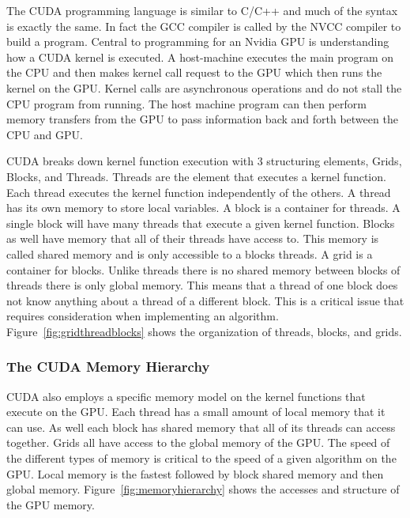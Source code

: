 \documentclass[conference]{IEEEtran}
\begin{document}
The CUDA programming language is similar to C/C++ and much of the syntax is exactly the same. In fact the GCC compiler is called by the NVCC compiler to build a program. Central to programming for an Nvidia GPU is understanding how a CUDA kernel is executed. A host-machine executes the main program on the CPU and then makes kernel call request to the GPU which then runs the kernel on the GPU. Kernel calls are asynchronous operations and do not stall the CPU program from running. The host machine program can then perform memory transfers from the GPU to pass information back and forth between the CPU and GPU.

CUDA breaks down kernel function execution with 3 structuring elements, Grids, Blocks, and Threads. Threads are the element that executes a kernel function. Each thread executes the kernel function independently of the others. A thread has its own memory to store local variables. A block is a container for threads. A single block will have many threads that execute a given kernel function. Blocks as well have memory that all of their threads have access to. This memory is called shared memory and is only accessible to a blocks threads. A grid is a container for blocks. Unlike threads there is no shared memory between blocks of threads there is only global memory. This means that a thread of one block does not know anything about a thread of a different block. This is a critical issue that requires consideration when implementing an algorithm. Figure~\ref{fig:gridthreadblocks} shows the organization of threads, blocks, and grids.


\subsubsection{The CUDA Memory Hierarchy}
CUDA also employs a specific memory model on the kernel functions that execute on the GPU. Each thread has a small amount of local memory that it can use. As well each block has shared memory that all of its threads can access together. Grids all have access to the global memory of the GPU. The speed of the different types of memory is critical to the speed of a given algorithm on the GPU. Local memory is the fastest followed by block shared memory and then global memory. Figure~\ref{fig:memoryhierarchy} shows the accesses and structure of the GPU memory.
\end{document}
